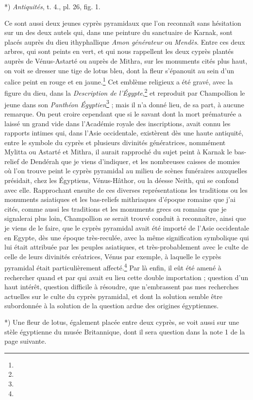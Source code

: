 \documentclass[a4paper, 11pt, oneside, polutonikogreek, french]{article}
\begin{document}
*) \emph{Antiquités}, t. 4., pl. 26, fig. 1.

Ce sont aussi deux jeunes cyprès pyramidaux que l'on reconnaît sans hésitation sur un des deux autels qui, dans une peinture du sanctuaire de Karnak, sont placés auprès du dieu ithyphallique \emph{Amon générateur} ou \emph{Mendès}. Entre ces deux arbres, qui sont peints en vert, et qui nous rappellent les deux cyprès plantés auprès de Vénus-Astarté ou auprès de Mithra, sur les monuments cités plus haut, on voit se dresser une tige de lotus bleu, dont la fleur s'épanouit au sein d'un calice peint en rouge et en jaune.\footnote{} Cet emblème religieux a été gravé, avec la figure du dieu, dans la \emph{Description de l'Égypte},\footnote{} et reproduit par Champollion le jeune dans son \emph{Panthéon Égyptien}\footnote{} ; mais il n'a donné lieu, de sa part, à aucune remarque. On peut croire cependant que si le savant dont la mort prématurée a laissé un grand vide dans l'Académie royale des inscriptions, avait connu les rapports intimes qui, dans l'Asie occidentale, existèrent dès une haute antiquité, entre le symbole du cyprès et plusieurs divinités génératrices, nommément Mylitta ou Astarté et Mithra, il aurait rapproché du sujet peint à Karnak le bas-relief de Dendérah que je viens d'indiquer, et les nombreuses caisses de momies où l'on trouve peint le cyprès pyramidal au milieu de scènes funéraires auxquelles présidait, chez les Égyptiens, Vénus-Hâthor, ou la déesse Neith, qui se confond avec elle. Rapprochant ensuite de ces diverses représentations les traditions ou les monuments asiatiques et les bas-reliefs mithriaques d'époque romaine que j'ai cités, comme aussi les traditions et les monuments grecs ou romains que je signalerai plus loin, Champollion se serait trouvé conduit à reconnaître, ainsi que je viens de le faire, que le cyprès pyramidal avait été importé de l'Asie occidentale en Egypte, dès une époque très-reculée, avec la même signification symbolique qui lui était attribuée par les peuples asiatiques, et très-probablement avec le culte de celle de leurs divinités créatrices, Vénus par exemple, à laquelle le cyprès pyramidal était particulièrement affecté.\footnote{} Par là enfin, il eût été amené à rechercher quand et par qui avait eu lieu cette double importation ; question d'un haut intérêt, question difficile à résoudre, que n'embrassent pas mes recherches actuelles sur le culte du cyprès pyramidal, et dont la solution semble être subordonnée à la solution de la question ardue des origines égyptiennes.

*) Une fleur de lotus, également placée entre deux cyprès, se voit aussi sur une stèle égyptienne du musée Britannique, dont il sera question dans la note 1 de la page suivante.
\end{document}
